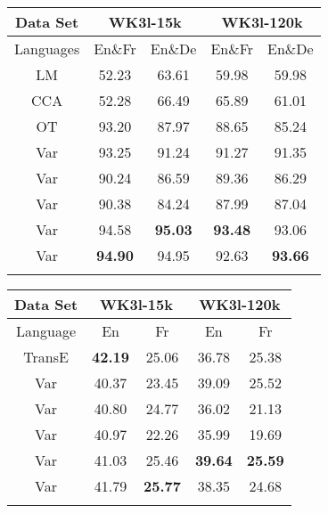 \documentclass{article}
\begin{document}
\begin{table*}[t!]
\begin{minipage}[t]{0.37\linewidth}
\centering
\captionsetup{justification=centering}
\caption{Accuracy of TWA verification (\%).}\label{tbl:alignment}
\vspace{-1em}
{\scriptsize
\begin{tabular}{c|cc|cc}
\bhline
Data Set & \multicolumn{2}{c|}{WK3l-15k} & \multicolumn{2}{c}{WK3l-120k}\\
\hline
Languages &  En\&Fr & En\&De & En\&Fr & En\&De\\
\bhline
LM&52.23&63.61&59.98&59.98\\
CCA&52.28&66.49&65.89&61.01\\
OT&93.20&87.97&88.65&85.24\\
\hline
Var&93.25&91.24&91.27&91.35\\
Var&90.24&86.59&89.36&86.29\\
Var&90.38&84.24&87.99&87.04\\
Var&94.58&\textbf{95.03}&\textbf{93.48}&93.06\\
Var&\textbf{94.90}&94.95&92.63&\textbf{93.66}\\
\bhline
\end{tabular}
}
\end{minipage}
\hfill
\begin{minipage}[t]{0.3\linewidth}
\centering
\captionsetup{justification=centering}
\caption{Results of tail prediction ().}\label{tbl:tail}
\vspace{-1em}
{\scriptsize
\begin{tabular}{c|cc|cc}
\bhline
Data Set & \multicolumn{2}{c|}{WK3l-15k} & \multicolumn{2}{c}{WK3l-120k}\\
\hline
Language & En & Fr & En & Fr\\
\bhline
TransE&\textbf{42.19}&25.06&36.78&25.38\\
Var&40.37&23.45&39.09&25.52\\
Var&40.80&24.77&36.02&21.13\\
Var&40.97&22.26&35.99&19.69\\
Var&41.03&25.46&\textbf{39.64}&\textbf{25.59}\\
Var&41.79&\textbf{25.77}&38.35&24.68\\
\bhline
\end{tabular}
}
\end{minipage}
\hfill
\begin{minipage}[t]{0.3\linewidth}
\centering
\captionsetup{justification=centering}
\caption{Results of relation prediction ().}\label{tbl:relation}

\end{minipage}
\end{table*}
\end{document}
